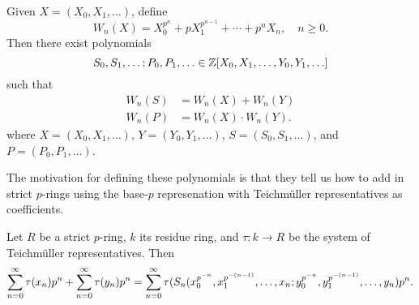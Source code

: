 \begin{lem}
Given $X=(X_0,X_1,\ldots)$, define
\[
W_n(X)=X_0^{p^n} +pX_1^{p^{n-1}} +\cdots +p^nX_n,\quad n\ge 0.
\]
Then there exist polynomials
\[
S_0,S_1,\ldots;P_0,P_1,\ldots\in \mathbb{Z}[X_0,X_1,\ldots,Y_0,Y_1,\ldots]
\]
such that
\begin{align*}
W_n(S)&=W_n(X)+W_n(Y)\\
W_n(P)&=W_n(X)\cdot W_n(Y).
\end{align*}
where $X=(X_0,X_1,\ldots)$, $Y=(Y_0,Y_1,\ldots)$, $S=(S_0,S_1,\ldots)$, and $P=(P_0,P_1,\ldots)$.
\end{lem}
The motivation for defining these polynomials is that %
they tell us how to add in strict $p$-rings using the base-$p$ represenation with Teichm\"uller representatives as coefficients.
\begin{thm}
Let $R$ be a strict $p$-ring, $k$ its residue ring, and 
$\tau:k\to R$ be the system of Teichm\"uller representatives. Then
\[
\sum_{n=0}^{\infty}\tau(x_n) p^n+\sum_{n=0}^{\infty} \tau(y_n)p^n = \sum_{n=0}^{\infty} \tau(S_n(x_0^{p^{-n}},x_1^{p^{-(n-1)}},\ldots, x_n; y_0^{p^{-n}},y_1^{p^{-(n-1)}},\ldots, y_n)p^n.
\]
\end{thm}

